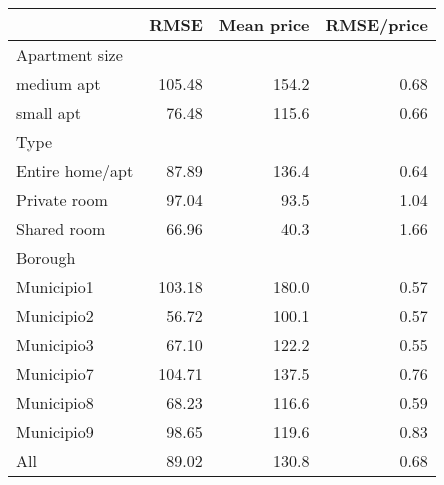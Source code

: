 
\begin{tabular}{lrrr}
\toprule
 & RMSE & Mean price & RMSE/price\\
\midrule
Apartment size &  &  & \\
medium apt & 105.48 & 154.2 & 0.68\\
small apt & 76.48 & 115.6 & 0.66\\
Type &  &  & \\
Entire home/apt & 87.89 & 136.4 & 0.64\\
Private room & 97.04 & 93.5 & 1.04\\
Shared room & 66.96 & 40.3 & 1.66\\
Borough &  &  & \\
Municipio1 & 103.18 & 180.0 & 0.57\\
Municipio2 & 56.72 & 100.1 & 0.57\\
Municipio3 & 67.10 & 122.2 & 0.55\\
Municipio7 & 104.71 & 137.5 & 0.76\\
Municipio8 & 68.23 & 116.6 & 0.59\\
Municipio9 & 98.65 & 119.6 & 0.83\\
All & 89.02 & 130.8 & 0.68\\
\bottomrule
\end{tabular}